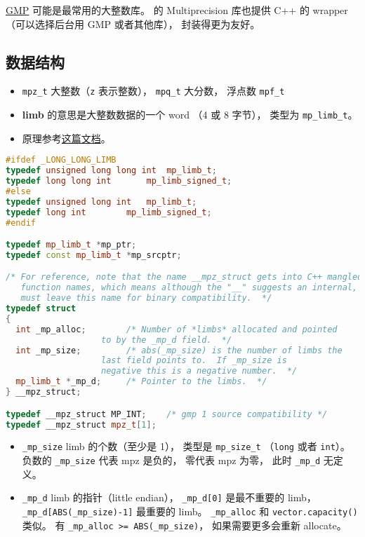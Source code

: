 
\begin{issues}
\issueDraft
\end{issues}

\href{https://gmplib.org/}{GMP} 可能是最常用的大整数库。  的 Multiprecision 库也提供 C++ 的 wrapper （可以选择后台用 GMP 或者其他库）， 封装得更为友好。

\subsection{数据结构}
\begin{itemize}
\item \verb|mpz_t| 大整数（\verb|z| 表示整数）， \verb|mpq_t| 大分数， 浮点数 \verb|mpf_t|
\item \textbf{limb} 的意思是大整数数据的一个 word （4 或 8 字节）， 类型为 \verb|mp_limb_t|。
\item 原理参考\href{https://gmplib.org/manual/Integer-Internals#Integer-Internals}{这篇文档}。
\end{itemize}

\begin{lstlisting}[language=cpp]
#ifdef _LONG_LONG_LIMB
typedef unsigned long long int	mp_limb_t;
typedef long long int		mp_limb_signed_t;
#else
typedef unsigned long int	mp_limb_t;
typedef long int		mp_limb_signed_t;
#endif

typedef mp_limb_t *mp_ptr;
typedef const mp_limb_t *mp_srcptr;

/* For reference, note that the name __mpz_struct gets into C++ mangled
   function names, which means although the "__" suggests an internal, we
   must leave this name for binary compatibility.  */
typedef struct
{
  int _mp_alloc;		/* Number of *limbs* allocated and pointed
				   to by the _mp_d field.  */
  int _mp_size;			/* abs(_mp_size) is the number of limbs the
				   last field points to.  If _mp_size is
				   negative this is a negative number.  */
  mp_limb_t *_mp_d;		/* Pointer to the limbs.  */
} __mpz_struct;

typedef __mpz_struct MP_INT;    /* gmp 1 source compatibility */
typedef __mpz_struct mpz_t[1];
\end{lstlisting}

\begin{itemize}
\item \verb|_mp_size| limb 的个数（至少是 1）， 类型是 \verb|mp_size_t| （\verb|long| 或者 \verb|int|）。 负数的 \verb|_mp_size| 代表 mpz 是负的， 零代表 mpz 为零， 此时 \verb|_mp_d| 无定义。
\item \verb|_mp_d| limb 的指针（little endian）， \verb|_mp_d[0]| 是最不重要的 limb， \verb|_mp_d[ABS(_mp_size)-1]| 最重要的 limb。
\verb|_mp_alloc| 和 \verb|vector.capacity()| 类似。 有 \verb|_mp_alloc >= ABS(_mp_size)|， 如果需要更多会重新 allocate。
\end{itemize}

